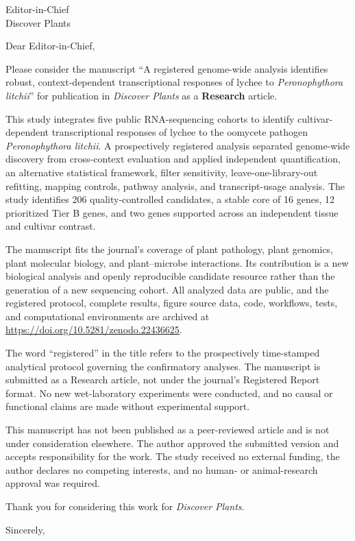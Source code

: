 \documentclass[11pt]{letter}
\begin{document}
\begin{letter}{Editor-in-Chief\\Discover Plants}
\opening{Dear Editor-in-Chief,}

Please consider the manuscript ``A registered genome-wide analysis identifies robust, context-dependent transcriptional responses of lychee to \textit{Peronophythora litchii}'' for publication in \textit{Discover Plants} as a \textbf{Research} article.

This study integrates five public RNA-sequencing cohorts to identify cultivar-dependent transcriptional responses of lychee to the oomycete pathogen \textit{Peronophythora litchii}. A prospectively registered analysis separated genome-wide discovery from cross-context evaluation and applied independent quantification, an alternative statistical framework, filter sensitivity, leave-one-library-out refitting, mapping controls, pathway analysis, and transcript-usage analysis. The study identifies 206 quality-controlled candidates, a stable core of 16 genes, 12 prioritized Tier B genes, and two genes supported across an independent tissue and cultivar contrast.

The manuscript fits the journal's coverage of plant pathology, plant genomics, plant molecular biology, and plant--microbe interactions. Its contribution is a new biological analysis and openly reproducible candidate resource rather than the generation of a new sequencing cohort. All analyzed data are public, and the registered protocol, complete results, figure source data, code, workflows, tests, and computational environments are archived at \url{https://doi.org/10.5281/zenodo.22436625}.

The word ``registered'' in the title refers to the prospectively time-stamped analytical protocol governing the confirmatory analyses. The manuscript is submitted as a Research article, not under the journal's Registered Report format. No new wet-laboratory experiments were conducted, and no causal or functional claims are made without experimental support.

This manuscript has not been published as a peer-reviewed article and is not under consideration elsewhere. The author approved the submitted version and accepts responsibility for the work. The study received no external funding, the author declares no competing interests, and no human- or animal-research approval was required.

Thank you for considering this work for \textit{Discover Plants}.

\closing{Sincerely,}
\end{letter}
\end{document}
